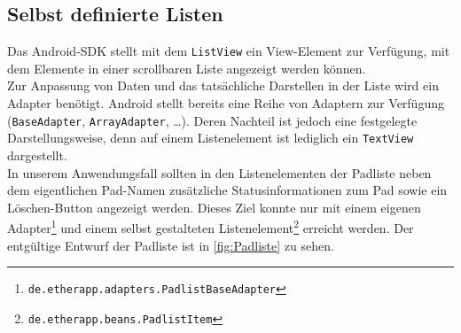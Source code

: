 \subsection{Selbst definierte Listen}
Das Android-SDK stellt mit dem \texttt{ListView} ein View-Element zur Verfügung, mit dem Elemente in einer scrollbaren Liste angezeigt werden können.\\
Zur Anpassung von Daten und das tatsächliche Darstellen in der Liste wird ein Adapter benötigt.
Android stellt bereits eine Reihe von Adaptern zur Verfügung (\texttt{BaseAdapter}, \texttt{ArrayAdapter}, …).
Deren Nachteil ist jedoch eine festgelegte Darstellungsweise, denn auf einem Listenelement ist lediglich ein \texttt{TextView} dargestellt.\\
In unserem Anwendungsfall sollten in den Listenelementen der Padliste neben dem eigentlichen Pad-Namen zusätzliche Statusinformationen zum Pad sowie ein Löschen-Button angezeigt werden.
Dieses Ziel konnte nur mit einem eigenen Adapter\footnote{\texttt{de.etherapp.adapters.PadlistBaseAdapter}} und einem selbst gestalteten Listenelement\footnote{\texttt{de.etherapp.beans.PadlistItem}} erreicht werden.
Der entgültige Entwurf der Padliste ist in \autoref{fig:Padliste} zu sehen.

